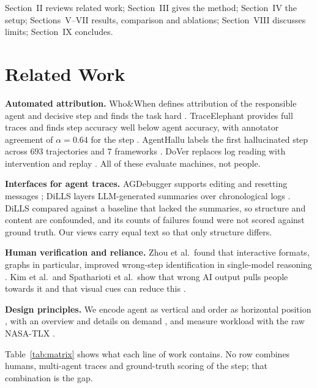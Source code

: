 \documentclass[conference]{IEEEtran}
\begin{document}
Section~II reviews related work; Section~III gives the method; Section~IV the setup; Sections~V--VII results, comparison and ablations; Section~VIII discusses limits; Section~IX concludes.

\section{Related Work}
\textbf{Automated attribution.} Who\&When defines attribution of the responsible agent and decisive step and finds the task hard \cite{zhang2025whowhen}. TraceElephant provides full traces and finds step accuracy well below agent accuracy, with annotator agreement of $\alpha = 0.64$ for the step \cite{chen2026elephant}. AgentHallu labels the first hallucinated step across 693 trajectories and 7 frameworks \cite{liu2026agenthallu}. DoVer replaces log reading with intervention and replay \cite{ma2026dover}. All of these evaluate machines, not people.

\textbf{Interfaces for agent traces.} AGDebugger supports editing and resetting messages \cite{epperson2025agdebugger}; DiLLS layers LLM-generated summaries over chronological logs \cite{sheng2026dills}. DiLLS compared against a baseline that lacked the summaries, so structure and content are confounded, and its counts of failures found were not scored against ground truth. Our views carry equal text so that only structure differs.

\textbf{Human verification and reliance.} Zhou et al.\ found that interactive formats, graphs in particular, improved wrong-step identification in single-model reasoning \cite{zhou2026verification}. Kim et al.\ and Spatharioti et al.\ show that wrong AI output pulls people towards it and that visual cues can reduce this \cite{kim2025reliance,spatharioti2025search}.

\textbf{Design principles.} We encode agent as vertical and order as horizontal position \cite{munzner2014vad}, with an overview and details on demand \cite{shneiderman1996eyes,cockburn2009overview}, and measure workload with the raw NASA-TLX \cite{hart1988tlx}.

Table~\ref{tab:matrix} shows what each line of work contains. No row combines humans, multi-agent traces and ground-truth scoring of the step; that combination is the gap.
\end{document}

